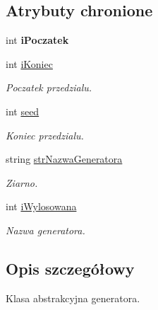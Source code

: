 \subsection*{Atrybuty chronione}
\begin{DoxyCompactItemize}
\item 
\hypertarget{classGenerator_a7e0b83b2cee515dd54debf073322acde}{int {\bfseries i\+Poczatek}}\label{classGenerator_a7e0b83b2cee515dd54debf073322acde}

\item 
\hypertarget{classGenerator_a235b3d02ce62d19e803cc2295eb7911e}{int \hyperlink{classGenerator_a235b3d02ce62d19e803cc2295eb7911e}{i\+Koniec}}\label{classGenerator_a235b3d02ce62d19e803cc2295eb7911e}

\begin{DoxyCompactList}\small\item\em Poczatek przedzialu. \end{DoxyCompactList}\item 
\hypertarget{classGenerator_ae77446ccb4946b8eb28d0f20f3e4a95f}{int \hyperlink{classGenerator_ae77446ccb4946b8eb28d0f20f3e4a95f}{seed}}\label{classGenerator_ae77446ccb4946b8eb28d0f20f3e4a95f}

\begin{DoxyCompactList}\small\item\em Koniec przedzialu. \end{DoxyCompactList}\item 
\hypertarget{classGenerator_a7e2c131c26baf31bb3f072115c619d1c}{string \hyperlink{classGenerator_a7e2c131c26baf31bb3f072115c619d1c}{str\+Nazwa\+Generatora}}\label{classGenerator_a7e2c131c26baf31bb3f072115c619d1c}

\begin{DoxyCompactList}\small\item\em Ziarno. \end{DoxyCompactList}\item 
\hypertarget{classGenerator_a386d211c8be5e1dd7b5672c6725f8ee3}{int \hyperlink{classGenerator_a386d211c8be5e1dd7b5672c6725f8ee3}{i\+Wylosowana}}\label{classGenerator_a386d211c8be5e1dd7b5672c6725f8ee3}

\begin{DoxyCompactList}\small\item\em Nazwa generatora. \end{DoxyCompactList}\end{DoxyCompactItemize}


\subsection{Opis szczegółowy}
Klasa abstrakcyjna generatora. 

